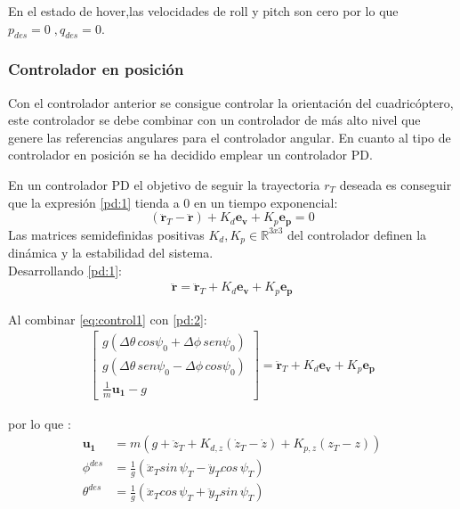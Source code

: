 En el estado de hover,las velocidades de roll y pitch son cero por lo que $p_{des} = 0\;, q_{des} = 0$.

\subsubsection{Controlador en posición}

Con el controlador anterior se consigue controlar la orientación del cuadricóptero, 
este controlador se debe combinar con un controlador de más alto nivel que genere las referencias angulares para el controlador angular.
En cuanto al tipo de controlador en posición se ha decidido emplear un controlador PD. 

En un controlador PD el objetivo de seguir la trayectoria $r_T$ deseada es conseguir que la expresión \ref{pd:1} tienda a 0 en un tiempo exponencial:
\begin{equation}
	\label{pd:1}
	\left(\mathbf{\ddot{r}}_{T} - \mathbf{\ddot{r}}\right) + K_d \mathbf{e_v} + K_p \mathbf{e_p} = 0
\end{equation}
Las matrices  semidefinidas positivas $K_d,K_p \in \mathbb{R}^{3x3}$ del controlador definen la dinámica y la estabilidad del sistema.
\\

Desarrollando \ref{pd:1}:
\begin{align}
	\label{pd:2}
	\mathbf{\ddot{r}}= \mathbf{\ddot{r}}_{T} + K_d \mathbf{e_v} + K_p \mathbf{e_p}
\end{align}

Al combinar \ref{eq:control1} con \ref{pd:2}:
\begin{align}\begin{bmatrix}
		g (\Delta\theta\, cos \psi_0 + \Delta\phi\,sen\psi_0)\\
		g(\Delta\theta\, sen \psi_0  - \Delta\phi\,cos\psi_0) \\
		\frac{1}{m}\mathbf{u_1}-g
	\end{bmatrix} 	= \mathbf{\ddot{r}}_T + K_d \mathbf{e_v} + K_p \mathbf{e_p}
\end{align}

por lo que :
\begin{align}
	\mathbf{u_1} &=m\left(g + \ddot{z}_T+ K_{d,z}(\dot{z}_T-\dot{z}) + K_{p,z}(z_T-z)\right)\\
	\phi^{des} &= \frac{1}{g}\left(\ddot{x}_{T} sin\,\psi_T -\ddot{y}_{T} cos\,\psi_T \right)\\
	\theta^{des} &= \frac{1}{g}\left(\ddot{x}_{T} cos\,\psi_T +\ddot{y}_{T} sin\,\psi_T \right)
\end{align}

